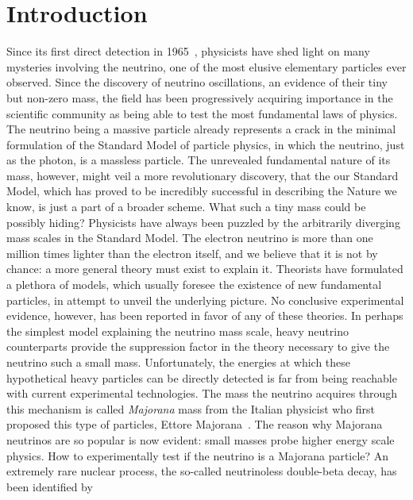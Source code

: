 
\chapter{Introduction}%
\label{chap:introduction}

Since its first direct detection in 1965~\cite{Cowan1956}, physicists have shed light on
many mysteries involving the neutrino, one of the most elusive elementary particles ever
observed. Since the discovery of neutrino oscillations, an evidence of their tiny but
non-zero mass, the field has been progressively acquiring importance in the scientific
community as being able to test the most fundamental laws of physics. The neutrino being a
massive particle already represents a crack in the minimal formulation of the Standard
Model of particle physics, in which the neutrino, just as the photon, is a massless
particle. The unrevealed fundamental nature of its mass, however, might veil a more
revolutionary discovery, that the our Standard Model, which has proved to be incredibly
successful in describing the Nature we know, is just a part of a broader scheme.
\newpar
What such a tiny mass could be possibly hiding? Physicists have always been puzzled by the
arbitrarily diverging mass scales in the Standard Model. The electron neutrino is more
than one million times lighter than the electron itself, and we believe that it is not by
chance: a more general theory must exist to explain it. Theorists have formulated a
plethora of models, which usually foresee the existence of new fundamental particles, in
attempt to unveil the underlying picture. No conclusive experimental evidence, however,
has been reported in favor of any of these theories. In perhaps the simplest model
explaining the neutrino mass scale, heavy neutrino counterparts provide the suppression
factor in the theory necessary to give the neutrino such a small mass. Unfortunately, the
energies at which these hypothetical heavy particles can be directly detected is far from
being reachable with current experimental technologies. The mass the neutrino acquires
through this mechanism is called \emph{Majorana} mass from the Italian physicist who first
proposed this type of particles, Ettore Majorana~\cite{Majorana1932}. The reason why
Majorana neutrinos are so popular is now evident: small masses probe higher energy scale
physics.
\newpar
How to experimentally test if the neutrino is a Majorana particle? An extremely rare
nuclear process, the so-called neutrinoless double-beta decay, has been identified by
